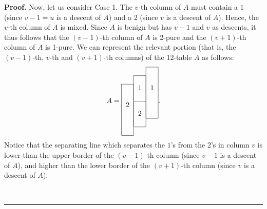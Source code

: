 \documentclass[12pt]{article}
\theoremstyle{plain}
\theoremstyle{definition}
\newenvironment{proof}[1][Proof]{\noindent\textbf{#1.} }{\ \rule{0.5em}{0.5em}}
\begin{document}
\begin{proof}
Now, let us consider Case 1.
The $v$-th column of $A$ must contain a $1$ (since $v-1 = u$ is a descent of $A$)
and a $2$ (since $v$ is a descent of $A$). Hence, the $v$-th column of $A$ is
mixed. Since $A$ is benign but has $v-1$ and $v$ as descents, it thus follows
that the $\left(  v-1\right)  $-th column of $A$ is
2-pure and the
$\left(  v+1\right)  $-th column of $A$ is 1-pure. We can represent the
relevant portion (that is, the $\left(v-1\right)$-th, $v$-th and
$\left(v+1\right)$-th columns) of the 12-table $A$ as follows:
\begin{equation}
A=%
\begin{tabular}{ccc}
\cline{3-3} & & \multicolumn{1}{|c|}{} \\
\cline{2-2} & \multicolumn{1}{|c|}{} & \multicolumn{1}{|c|}{} \\
\cline{1-1} \multicolumn{1}{|c|}{} & \multicolumn{1}{|c|}{1} & \multicolumn
{1}{|c|}{1} \\
\multicolumn{1}{|c|}{} & \multicolumn{1}{|c|}{} & \multicolumn{1}{|c|}{} \\
\cline{2-2} \multicolumn{1}{|c|}{2} & \multicolumn{1}{|c|}{} & \multicolumn
{1}{|c|}{} \\
\multicolumn{1}{|c|}{} & \multicolumn{1}{|c|}{2} & \multicolumn{1}{|c|}{} \\
\cline{3-3} \multicolumn{1}{|c|}{} & \multicolumn{1}{|c|}{} \\
\cline{2-2} \multicolumn{1}{|c|}{} \\
\cline{1-1}
\end{tabular}%
. \label{pf.prop.descent-resolution.hyps.short.A}%
\end{equation}
Notice that the separating line which separates the $1$'s from the
$2$'s in column $v$ is lower than the upper border of the
$\left(v-1\right)$-th column (since $v-1$ is a descent of $A$), and
higher than the lower border of the $\left(v+1\right)$-th column
(since $v$ is a descent of $A$).


\end{proof}
\end{document}
